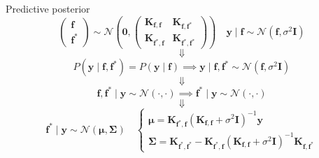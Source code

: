 \documentclass[10pt]{beamer}
\begin{document}
\begin{frame}{Predictive posterior}
    \[
        \begin{pmatrix} \bm f \\ \bm f^* \end{pmatrix} \sim \mathcal{N}\left(\bm{0}, \begin{pmatrix}
            \bm K_{\bm f, \bm f} & \bm K_{\bm f, \bm f^*} \\
            \bm K_{\bm f^*, \bm f} &\bm K_{\bm f^*, \bm f^*}
         \end{pmatrix} \right) \quad
        \bm{y} \mid \bm f \sim \mathcal{N}( \bm f, \sigma^2\bm{I})
    \]
    \[
         \Downarrow
    \]
    \[
        P(\bm y \mid \bm f, \bm f^*) = P(\bm y \mid \bm f) \implies \bm y \mid \bm f, \bm f^* \sim \mathcal{N}(\bm f, \sigma^2 \bm I)
    \]
    \[
         \Downarrow
    \]
    \[
         \bm f, \bm f^* \mid \bm y \sim \mathcal{N}(\cdot, \cdot) \implies \bm f^* \mid \bm y \sim \mathcal{N}(\cdot, \cdot)
    \]
    \[
         \Downarrow
    \]
    \[
         \bm f^* \mid \bm{y} \sim \mathcal{N}(\bm{\mu}, \bm{\Sigma}) \quad
         \begin{cases}
         \bm \mu = \bm K_{\bm f^*, \bm f}(\bm K_{\bm f, \bm f} + \sigma^2\bm I)^{-1}\bm y\\
         \bm{\Sigma} = \bm K_{\bm f^*, \bm f^*} - \bm K_{\bm f^*, \bm f}(\bm K_{\bm f, \bm f}   + \sigma^2 \bm I)^{-1} \bm K_{\bm f, \bm f^*} 
         \end{cases}
    \]

\end{frame}
\end{document}
